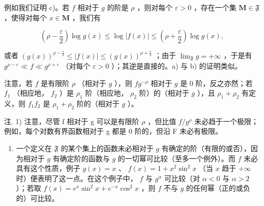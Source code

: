 例如我们证明 c)。若 \(f\) 相对于 \(g\) 的阶是 \(\rho\) ，则对每个 \(\varepsilon > 0\) ，存在一个集 \(\mathbf{M} \in \mathfrak{F}\) ，使得对每个 \(x \in \mathbf{M}\) ，我们有

\[
\left(\rho - \frac {\varepsilon}{2}\right) \log g (x) \leqslant \log | f (x) | \leqslant \left(\rho + \frac {\varepsilon}{2}\right) \log g (x),
\]

或者 \((g(x))^{\rho-\frac{\varepsilon}{2}} \leqslant |f(x)| \leqslant (g(x))^{\rho+\frac{\varepsilon}{2}}\) ；由于 \(\lim_{\mathfrak{F}} g = +\infty\) ，于是有 \(g^{\rho-\varepsilon} \ll f \ll g^{\rho+\varepsilon}\) （对每个 \(\varepsilon > 0\) ）；其逆是直接的。a) 与 b) 的证明类似。

注意，若 \(f\) 是有限阶 \(\rho\) （相对于 \(g\) ），则 \(fg^{-\rho}\) 相对于 \(g\) 是 0 阶，反之亦然；若 \(f_1\) （相应地， \(f_2\) ）是 \(\rho_1\) 阶（相应地， \(\rho_2\) 阶）的（相对于 \(g\) ），且 \(\rho_1 + \rho_2\) 有定义，则 \(f_1f_2\) 是 \(\rho_1 + \rho_2\) 阶的（相对于 \(g\) ）。

注. 1) 注意，尽管 f 相对于 g 可以是有限阶 \(\rho\) ，但比值 \(f/g^{\rho}\) 未必趋于一个极限；例如，每个对数有界函数相对于 g 都是 0 阶的，但沿 F 未必有极限。

\begin{enumerate}
\def\labelenumi{\arabic{enumi})}
\setcounter{enumi}{1}
\tightlist
\item
  一个定义在 \(\mathfrak{F}\) 的某个集上的函数未必相对于 \(g\) 有确定的阶（有限的或否），因为相对于 \(g\) 有确定阶的函数与 \(g\) 的一切幂可比较（至多一个例外）。而 \(f\) 未必具有这个性质，例子 \(g(x) = x\) 、 \(f(x) = 1 + x^2 \sin^2 x\) （当 \(x\) 趋于 \(+\infty\) 时）便表明了这一点。在这个例子中， \(f\) 与 \(g^\alpha\) 可比较（对 \(\alpha < 0\) 与 \(\alpha > 2\) ）；若取 \(f(x) = e^x \sin^2 x + e^{-x} \cos^2 x\) ，则 \(f\) 不与 \(g\) 的任何幂（正的或负的）可比较。
\end{enumerate}

